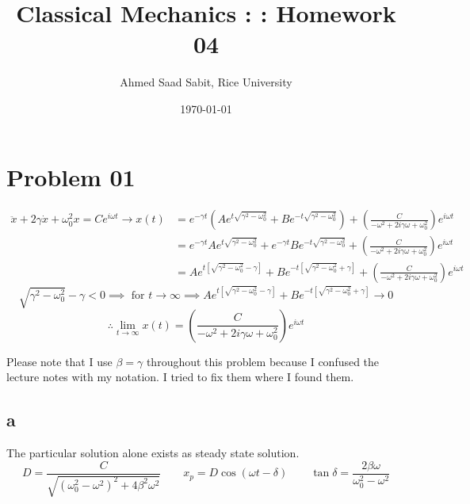 \documentclass[12pt,letter]{article}
\title{Classical Mechanics : : Homework 04}
\author{Ahmed Saad Sabit, Rice University}
\date{\today}
\begin{document}
\maketitle

\section*{Problem 01} 
\begin{align*}
	\boxed{
\ddot{x}  + 2 \gamma \dot{x} +  \omega_0^2 x = C e^{i \omega t}
}\to  	x(t) &= e^{- \gamma t} 
\left(
A e^{t \sqrt{\gamma^2 - \omega_0^2} } 
+ 
B e^{-t \sqrt{\gamma^2 - \omega_0^2} }
\right) 
+ 
\left(
\frac{C}{- \omega^2 + 2 i \gamma \omega + \omega_0^2} \right)
e^{i \omega t} \\
	 &= e^{- \gamma t} 
A e^{t \sqrt{\gamma^2 - \omega_0^2} } 
+ 
e^{- \gamma t}
B e^{-t \sqrt{\gamma^2 - \omega_0^2} }
+ 
\left(
\frac{C}{- \omega^2 + 2 i \gamma \omega + \omega_0^2} \right)
e^{i \omega t} \\
	 &= 
	 A e^{t [ \sqrt{\gamma^2 - \omega_0^2} - \gamma ] } 
+ 
B e^{-t [\sqrt{\gamma^2 - \omega_0^2}+ \gamma]  }
+ 
\left(
\frac{C}{- \omega^2 + 2 i \gamma \omega + \omega_0^2} \right)
e^{i \omega t} 
\end{align*}
\[
\sqrt{\gamma^2 - \omega_0^2 }  - \gamma < 0  \implies \text{ for } t \to  \infty \implies
	 A e^{t [ \sqrt{\gamma^2 - \omega_0^2} - \gamma ] } 
+ 
B e^{-t [\sqrt{\gamma^2 - \omega_0^2}+ \gamma]  } \to  0
\] 
\begin{equation*}
	\therefore
	\lim_{t \to \infty} x(t) = \left(\frac{C}{- \omega^2 + 2i \gamma \omega + \omega_0^2}\right) e^{i \omega t} \tag{steady state solution}
\end{equation*}

Please note that I use $\beta = \gamma$ throughout this problem because I confused the lecture notes with my notation. I tried to fix them where I found them.



\subsection*{a}
The particular solution alone exists as steady state solution. 
\[
D = \frac{C}{\sqrt{(\omega_0^2- \omega^2)^2 + 4 \beta^2 \omega^2} }
\qquad
x_p = D \cos(\omega t - \delta)
\qquad
\tan \delta = 
\frac{2 \beta \omega}{\omega_0^2 - \omega^2}
\]
\end{document}
